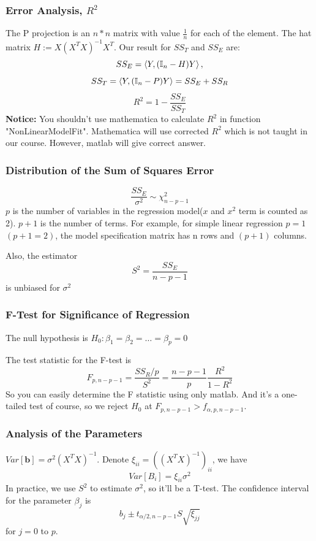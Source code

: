 \documentclass{beamer}
\begin{document}
\begin{frame}
    \frametitle{Error Analysis, $R^2$}

    The P projection is an $n*n$ matrix with value $\frac{1}{n}$ for each of the element. The hat matrix $H:=X(X^{T}X)^{-1}X^{T}$. Our result for $SS_{T}$ and $SS_{E}$ are:
    \[SS_{E}=\Braket{Y, (\mathbb{I}_{n}-H)Y}, \]
    \[SS_{T}=\Braket{Y,(\mathbb{I}_{n}-P)Y}=SS_{E}+SS_{R}\]
    \[R^2=1-\frac{SS_{E}}{SS_{T}}\]
    \textbf{Notice:} You shouldn't use mathematica to calculate $R^2$ in function "NonLinearModelFit". Mathematica will use corrected $R^2$ which is not taught in our course. However, matlab will give correct answer.

\end{frame}

\begin{frame}
    \frametitle{Distribution of the Sum of Squares Error}

    \[\frac{SS_E}{\sigma^2}\sim \chi^2_{n-p-1}\]
    $p$ is the number of variables in the regression model($x$ and $x^2$ term is counted as 2). $p+1$ is the number of terms. For example, for simple linear regression $p=1$ $(p+1=2)$, the model specification matrix has n rows and $(p+1)$ columns.\par
    Also, the estimator 
    \[S^2=\frac{SS_E}{n-p-1}\]
    is unbiased for $\sigma^2$

\end{frame}

\begin{frame}
    \frametitle{F-Test for Significance of Regression}
    The null hypothesis is $H_0: \beta_1=\beta_2=\dots  =\beta_p=0$\par
    The test statistic for the F-test is 
    \[F_{p,n-p-1}=\frac{SS_R/p}{S^2}=\frac{n-p-1}{p}\frac{R^2}{1-R^2}\]
    So you can easily determine the F statistic using only matlab. And it's a one-tailed test of course, so we reject $H_0$ at $F_{p,n-p-1}>f_{\alpha, p,n-p-1}$.\par


\end{frame}

\begin{frame}
    \frametitle{Analysis of the Parameters}

    $Var[\textbf{b}]=\sigma^2(X^{T}X)^{-1}$. Denote $\xi_{ii}=((X^{T}X)^{-1})_{ii}$, we have 
    \[Var[B_i]=\xi_{ii}\sigma^2\]
    In practice, we use $S^2$ to estimate $\sigma^2$, so it'll be a T-test. The confidence interval for the parameter $\beta_j$ is
    \[b_j\pm t_{\alpha/2, n-p-1}S\sqrt{\xi_{jj}}\]
    for $j=0$ to $p$.

\end{frame}
\end{document}
